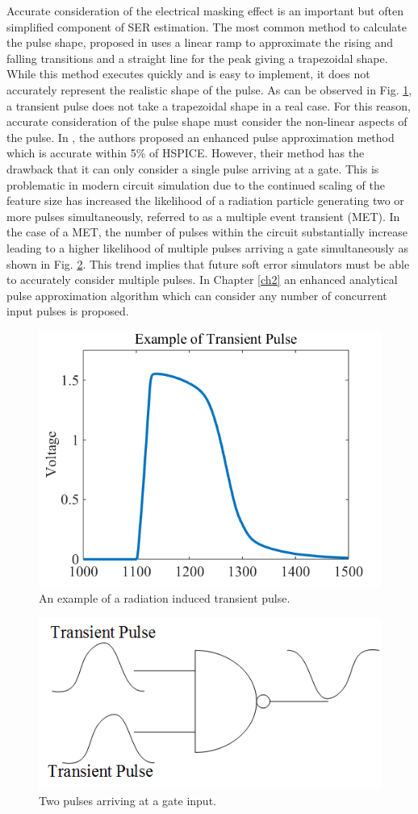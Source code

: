 Accurate consideration of the electrical masking effect is an important but often simplified component of SER estimation. The most common method to calculate the pulse shape, proposed in \cite{Omana_Trap} uses a linear ramp to approximate the rising and falling transitions and a straight line for the peak giving a trapezoidal shape. While this method executes quickly and is easy to implement, it does not accurately represent the realistic shape of the pulse. As can be observed in Fig. \ref{T_pulse}, a transient pulse does not take a trapezoidal shape in a real case. For this reason, accurate consideration of the pulse shape must consider the non-linear aspects of the pulse. In \cite{Accurate_Masking}, the authors proposed an enhanced pulse approximation method which is accurate within 5\% of HSPICE. However, their method has the drawback that it can only consider a single pulse arriving at a gate. This is problematic in modern circuit simulation due to the continued scaling of the feature size has increased the likelihood of a radiation particle generating two or more pulses simultaneously, referred to as a multiple event transient (MET).
In the case of a MET, the number of pulses within the circuit substantially increase leading to a higher likelihood of multiple pulses arriving a gate simultaneously as shown in Fig. \ref{G_pulse}. This trend implies that future soft error simulators must be able to accurately consider multiple pulses. In Chapter \ref{ch2} an enhanced analytical pulse approximation algorithm which can consider any number of concurrent input pulses is proposed.

\begin{figure}[!htbp]
	\centering
	\includegraphics[width=0.45\linewidth]{Figures/Pulse_Shape}
	\caption{An example of a radiation induced transient pulse.}
	\label{T_pulse}
\end{figure} 

\begin{figure}[!htbp]
	\centering
	\includegraphics[width=0.45\linewidth]{Figures/gatepulse}
	\caption{Two pulses arriving at a gate input.}
	\label{G_pulse}
\end{figure} 

